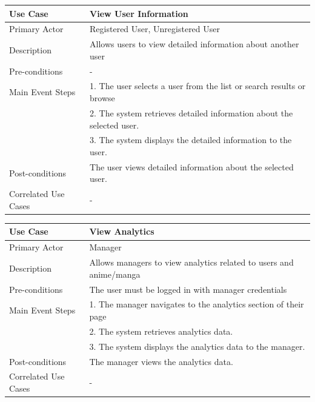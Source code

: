 \newpage

\begin{longtable}{|p{}|p{}|}
    \hline
    \rowcolor{lightblue}
    \textbf{Use Case} & \textbf{View User Information} \\
    \hline
    Primary Actor & Registered User, Unregistered User\\
    \hline
    Description & Allows users to view detailed information about another user\\
    \hline
    Pre-conditions & -\\
    \hline
    Main Event Steps& 1. The user selects a user from the list or search results or browse \\
    & 2. The system retrieves detailed information about the selected user. \\
    & 3. The system displays the detailed information to the user. \\
    \hline
    Post-conditions &The user views detailed information about the selected user.  \\
    \hline
    Correlated Use Cases & - \\
    \hline
\end{longtable}

\begin{longtable}{|p{}|p{}|}
    \hline
    \rowcolor{lightblue}
    \textbf{Use Case} & \textbf{View Analytics} \\
    \hline
    Primary Actor & Manager \\
    \hline
    Description & Allows managers to view analytics related to users and anime/manga\\
    \hline
    Pre-conditions & The user must be logged in with manager credentials\\
    \hline
    Main Event Steps & 1. The manager navigates to the analytics section of their page \\
    & 2. The system retrieves analytics data. \\
    & 3. The system displays the analytics data to the manager. \\
    \hline
    Post-conditions & The manager views the analytics data.\\
    \hline
    Correlated Use Cases & -\\
    \hline
\end{longtable}

\vspace{\baselineskip}

